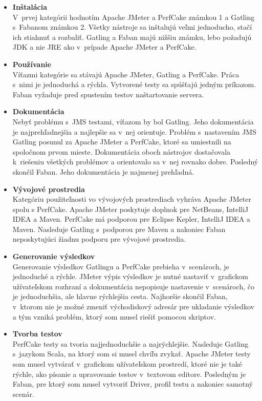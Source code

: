 \documentclass[12pt,oneside,final]{fithesis-utf8}
\begin{document}
\begin{itemize}

\item \textbf{Inštalácia}\\
V~prvej kategórii hodnotím Apache JMeter a PerfCake známkou 1 a Gatling s~Fabanom známkou 2. Všetky nástroje sa inštalujú veľmi jednoducho, stačí ich stiahnuť a rozbaliť. Gatling a Faban majú nižšiu známku, lebo požadujú JDK a nie JRE ako v~prípade Apache JMeter a PerfCake.

\item \textbf{Používanie}\\
Víťazmi kategórie sa stávajú Apache JMeter, Gatling a PerfCake. Práca s~nimi je jednoduchá a rýchla. Vytvorené testy sa spúšťajú jedným príkazom. Faban vyžaduje pred spustením testov naštartovanie servera.

\item \textbf{Dokumentácia}\\
Nebyť problému s~JMS testami, víťazom by bol Gatling. Jeho dokumentácia je najprehľadnejšia a najlepšie sa v~nej orientuje. Problém s~nastavením JMS Gatling posunul za Apache JMeter a PerfCake, ktoré sa umiestnili na spoločnom prvom mieste. Dokumentácia oboch nástrojov dostačovala k~riešeniu všetkých problémov a orientovalo sa v~nej rovnako dobre. Posledný skončil Faban. Jeho dokumentácia je najmenej prehľadná. 

\item \textbf{Vývojové prostredia}\\
Kategóriu použiteľnosti vo vývojových prostrediach vyhráva Apache JMeter spolu s PerfCake. Apache JMeter poskytuje doplnok pre NetBeans, IntelliJ IDEA a Maven. PerfCake má podporou pre Eclipse Kepler, IntelliJ IDEA a Maven. Nasleduje Gatling s~podporou pre Maven a nakoniec Faban neposkytujúci žiadnu podporu pre vývojové prostredia.

\item \textbf{Generovanie výsledkov}\\
Generovanie výsledkov Gatlingu a PerfCake prebieha v~scenároch, je jednoduché a rýchle. JMeter výpis výsledkov je nutné nastaviť v~grafickom užívateľskom rozhraní a dokumentácia nepopisuje nastavenie v~scenároch, čo je jednoduchšia, ale hlavne rýchlejšia cesta. Najhoršie skončil Faban, v~ktorom nie je možné zmeniť východiskový adresár pre ukladanie výsledkov a tým vzniká problém, ktorý som musel riešiť pomocou skriptov.

\item \textbf{Tvorba testov}\\
PerfCake testy sa tvoria najjednoduchšie a najrýchlejšie. Nasleduje Gatling s~jazykom Scala, na ktorý som si musel chvíľu zvykať. Apache JMeter testy som musel vytvárať v~grafickom užívateľskom prostredí, ktoré nie je také rýchle, ako písanie a upravovanie testov v~textovom editore. Posledným je Faban, pre ktorý som musel vytvoriť Driver, profil testu a nakoniec samotný scenár.


\end{itemize}
\end{document}
